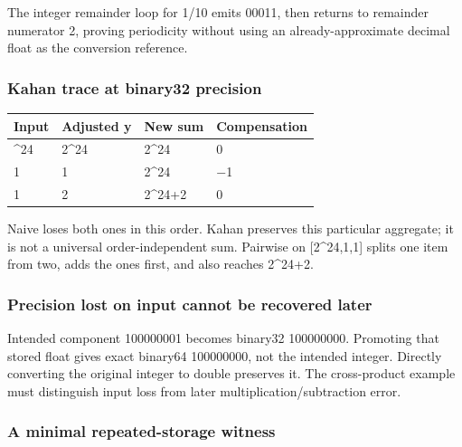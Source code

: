 The integer remainder loop for 1/10 emits 00011, then returns to remainder numerator 2, proving periodicity without using an already-approximate decimal float as the conversion reference.

\subsubsection{Kahan trace at binary32 precision}\label{appendix-92ff77d4dfdc-kahan-trace-at-binary32-precision}

\hypertarget{appendix-92ff77d4dfdc-kahan-trace-at-binary32-precision}{}

{\def\LTcaptype{none} %
\begin{longtable}[]{@{}llll@{}}
\toprule\noalign{}
Input & Adjusted y & New sum & Compensation \\
\midrule\noalign{}
\endhead
\bottomrule\noalign{}
\endlastfoot
2\^{}24 & 2\^{}24 & 2\^{}24 & 0 \\
1 & 1 & 2\^{}24 & −1 \\
1 & 2 & 2\^{}24+2 & 0 \\
\end{longtable}
}

Naive loses both ones in this order. Kahan preserves this particular aggregate; it is not a universal order-independent sum. Pairwise on {[}2\^{}24,1,1{]} splits one item from two, adds the ones first, and also reaches 2\^{}24+2.

\subsubsection{Precision lost on input cannot be recovered later}\label{appendix-92ff77d4dfdc-precision-lost-on-input-cannot-be-recovered-later}

\hypertarget{appendix-92ff77d4dfdc-precision-lost-on-input-cannot-be-recovered-later}{}

Intended component 100000001 becomes binary32 100000000. Promoting that stored float gives exact binary64 100000000, not the intended integer. Directly converting the original integer to double preserves it. The cross-product example must distinguish input loss from later multiplication/subtraction error.

\subsubsection{A minimal repeated-storage witness}\label{appendix-92ff77d4dfdc-a-minimal-repeated-storage-witness}

